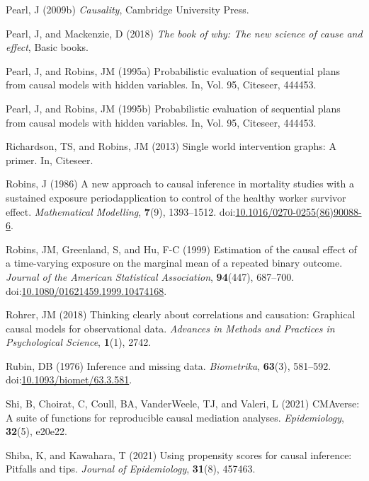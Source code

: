 \documentclass[
  singlecolumn,
  9pt]{article}
\begin{document}
\begin{CSLReferences}
Pearl, J (2009b) \emph{Causality}, Cambridge University Press.

Pearl, J, and Mackenzie, D (2018) \emph{The book of why: The new science
of cause and effect}, Basic books.

Pearl, J, and Robins, JM (1995a) Probabilistic evaluation of sequential
plans from causal models with hidden variables. In, Vol. 95, Citeseer,
444453.

Pearl, J, and Robins, JM (1995b) Probabilistic evaluation of sequential
plans from causal models with hidden variables. In, Vol. 95, Citeseer,
444453.

Richardson, TS, and Robins, JM (2013) Single world intervention graphs:
A primer. In, Citeseer.

Robins, J (1986) A new approach to causal inference in mortality studies
with a sustained exposure period{\textemdash}application to control of
the healthy worker survivor effect. \emph{Mathematical Modelling},
\textbf{7}(9), 1393--1512.
doi:\href{https://doi.org/10.1016/0270-0255(86)90088-6}{10.1016/0270-0255(86)90088-6}.

Robins, JM, Greenland, S, and Hu, F-C (1999) Estimation of the causal
effect of a time-varying exposure on the marginal mean of a repeated
binary outcome. \emph{Journal of the American Statistical Association},
\textbf{94}(447), 687--700.
doi:\href{https://doi.org/10.1080/01621459.1999.10474168}{10.1080/01621459.1999.10474168}.

Rohrer, JM (2018) Thinking clearly about correlations and causation:
Graphical causal models for observational data. \emph{Advances in
Methods and Practices in Psychological Science}, \textbf{1}(1), 2742.

Rubin, DB (1976) Inference and missing data. \emph{Biometrika},
\textbf{63}(3), 581--592.
doi:\href{https://doi.org/10.1093/biomet/63.3.581}{10.1093/biomet/63.3.581}.

Shi, B, Choirat, C, Coull, BA, VanderWeele, TJ, and Valeri, L (2021)
CMAverse: A suite of functions for reproducible causal mediation
analyses. \emph{Epidemiology}, \textbf{32}(5), e20e22.

Shiba, K, and Kawahara, T (2021) Using propensity scores for causal
inference: Pitfalls and tips. \emph{Journal of Epidemiology},
\textbf{31}(8), 457463.


\end{CSLReferences}
\end{document}
